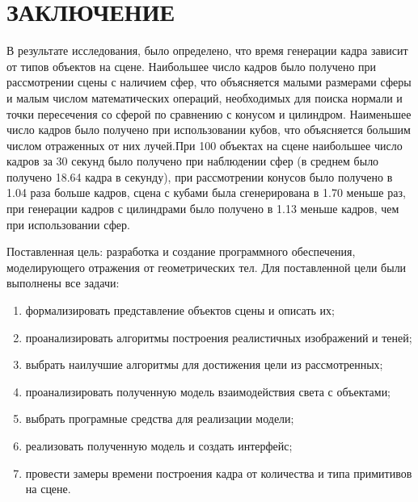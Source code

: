 \chapter*{\hfill{\centering  ЗАКЛЮЧЕНИЕ}\hfill}

В результате исследования, было определено, что время генерации кадра зависит от типов объектов на сцене. Наибольшее число кадров было получено при рассмотрении сцены с наличием сфер, что объясняется малыми размерами сферы и малым числом математических операций, необходимых для поиска нормали и точки пересечения со сферой по сравнению с конусом и цилиндром. Наименьшее число кадров было получено
при использовании кубов, что объясняется большим числом отраженных от них лучей.При 100 объектах на сцене наибольшее число кадров за 30 секунд было получено при наблюдении сфер (в среднем было получено 18.64 кадра в секунду), при рассмотрении конусов было получено в 1.04 раза больше кадров, сцена с кубами была сгенерирована  в 1.70 меньше раз, при генерации кадров с цилиндрами было получено  в 1.13 меньше кадров, чем при использовании сфер.

Поставленная цель: разработка и создание программного обеспечения, моделирующего отражения от геометрических тел.
Для поставленной цели были выполнены все задачи:
\begin{enumerate}
	\item формализировать представление объектов сцены и описать их;
	\item проанализировать алгоритмы построения реалистичных изображений и теней;
	\item выбрать наилучшие алгоритмы для достижения цели  из рассмотренных;
	\item проанализировать полученную  модель взаимодействия света с объектами;
	\item выбрать програмные средства для реализации модели;
	\item реализовать полученную модель и создать интерфейс;
	\item провести замеры времени построения кадра от количества и типа примитивов на сцене.
\end{enumerate}